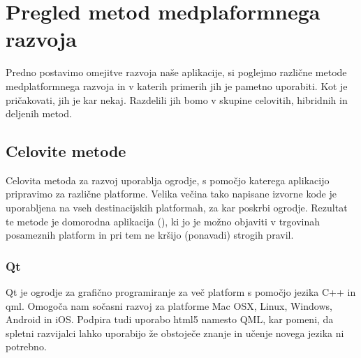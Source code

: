

\chapter{Pregled metod medplaformnega razvoja}
\label{chap:overview}

Predno postavimo omejitve razvoja naše aplikacije, si poglejmo različne metode medplatformnega razvoja in v katerih primerih jih je pametno uporabiti. Kot je pričakovati, jih je kar nekaj. Razdelili jih bomo v skupine celovitih, hibridnih in deljenih metod.

\section{Celovite metode}

Celovita metoda za razvoj uporablja ogrodje, s pomočjo katerega aplikacijo pripravimo za različne platforme. Velika večina tako napisane izvorne kode je uporabljena na vseh destinacijskih platformah, za kar poskrbi ogrodje. Rezultat te metode je domorodna aplikacija (), ki jo je možno objaviti v trgovinah posameznih platform in pri tem ne kršijo (ponavadi) strogih pravil.

\subsection{Qt}

Qt\cite{qt} je ogrodje za grafično programiranje za več platform s pomočjo jezika C++ in \gls{qml}. Omogoča nam sočasni razvoj za platforme Mac OSX, Linux, Windows, Android in iOS. Podpira tudi uporabo \gls{html5} namesto QML, kar pomeni, da spletni razvijalci lahko uporabijo že obstoječe znanje in učenje novega jezika ni potrebno.

